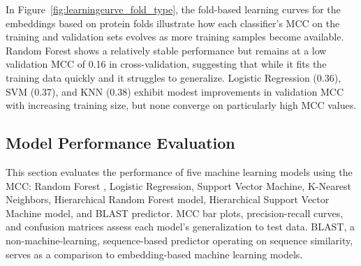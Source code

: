 In Figure~\ref{fig:learningcurve_fold_type}, the fold-based learning curves for the embeddings based on protein folds illustrate how each classifier's \gls{MCC} on the training and validation sets evolves as more training samples become available. Random Forest shows a relatively stable performance but remains at a low validation \gls{MCC} of 0.16 in cross-validation, suggesting that while it fits the training data quickly and it struggles to generalize. Logistic Regression (0.36), \gls{SVM} (0.37), and \gls{KNN} (0.38) exhibit modest improvements in validation \gls{MCC} with increasing training size, but none converge on particularly high \gls{MCC} values. 


\subsection{Model Performance Evaluation}

This section evaluates the performance of five machine learning models using the  \gls{MCC}: Random Forest , Logistic Regression, Support Vector Machine, K-Nearest Neighbors, Hierarchical Random Forest model, Hierarchical Support Vector Machine model, and \gls{BLAST} predictor. \gls{MCC} bar plots, precision-recall curves, and confusion matrices assess each model’s generalization to test data. \gls{BLAST}, a non-machine-learning, sequence-based predictor operating on sequence similarity, serves as a comparison to embedding-based machine learning models.

